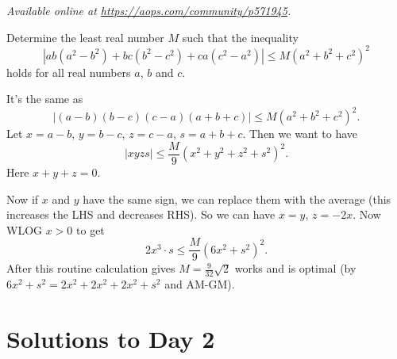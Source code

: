 \textsl{Available online at \url{https://aops.com/community/p571945}.}
\begin{mdframed}[style=mdpurplebox,frametitle={Problem statement}]
Determine the least real number $M$ such that the inequality
\[ \left\lvert ab(a^2-b^2)+bc(b^2-c^2)+ca(c^2-a^2) \right\rvert
  \leq M\left( a^2+b^2+c^2 \right)^2 \]
holds for all real numbers $a$, $b$ and $c$.
\end{mdframed}
It's the same as
\[ \left\lvert (a-b)(b-c)(c-a)(a+b+c) \right\rvert
\le M \left( a^2+b^2+c^2 \right)^2. \]
Let $x=a-b$, $y=b-c$, $z=c-a$, $s=a+b+c$.
Then we want to have
\[
  \left\lvert xyzs \right\rvert
  \le \frac{M}{9} (x^2+y^2+z^2+s^2)^2.
\]
Here $x+y+z=0$.

Now if $x$ and $y$ have the same sign,
we can replace them with the average
(this increases the LHS and decreases RHS).
So we can have $x=y$, $z=-2x$.
Now WLOG $x > 0$ to get
\[ 2x^3 \cdot s \le \frac{M}{9} \left( 6x^2+s^2 \right)^2. \]
After this routine calculation gives
$M = \frac{9}{32}\sqrt2$ works and is optimal
(by $6x^2+s^2 = 2x^2 + 2x^2 + 2x^2 + s^2$ and AM-GM).
\pagebreak

\section{Solutions to Day 2}